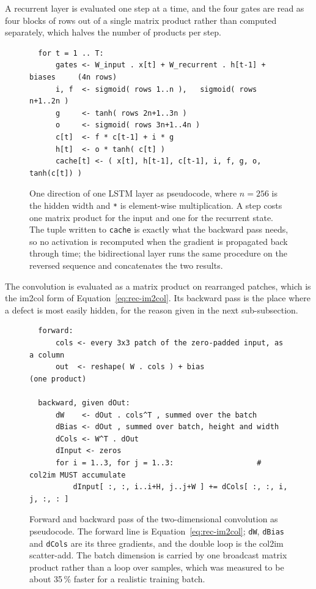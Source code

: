 A recurrent layer is evaluated one step at a time, and the four gates are read as four blocks of rows out of a single matrix product rather than computed separately, which halves the number of products per step.

\begin{figure}[h]
\centering
\fontsize{8.5}{10.2}\selectfont
\begin{verbatim}
  for t = 1 .. T:
      gates <- W_input . x[t] + W_recurrent . h[t-1] + biases     (4n rows)
      i, f  <- sigmoid( rows 1..n ),   sigmoid( rows n+1..2n )
      g     <- tanh( rows 2n+1..3n )
      o     <- sigmoid( rows 3n+1..4n )
      c[t]  <- f * c[t-1] + i * g
      h[t]  <- o * tanh( c[t] )
      cache[t] <- ( x[t], h[t-1], c[t-1], i, f, g, o, tanh(c[t]) )
\end{verbatim}
\caption{One direction of one LSTM layer as pseudocode, where $n=256$ is the hidden width and \texttt{*} is element-wise multiplication. A step costs one matrix product for the input and one for the recurrent state. The tuple written to \texttt{cache} is exactly what the backward pass needs, so no activation is recomputed when the gradient is propagated back through time; the bidirectional layer runs the same procedure on the reversed sequence and concatenates the two results.}
\label{fig:rec-lstmpseudo}
\end{figure}

The convolution is evaluated as a matrix product on rearranged patches, which is the im2col form of Equation~\ref{eq:rec-im2col}.
Its backward pass is the place where a defect is most easily hidden, for the reason given in the next sub-subsection.

\begin{figure}[h]
\centering
\fontsize{8.5}{10.2}\selectfont
\begin{verbatim}
  forward:
      cols <- every 3x3 patch of the zero-padded input, as a column
      out  <- reshape( W . cols ) + bias                     (one product)

  backward, given dOut:
      dW    <- dOut . cols^T , summed over the batch
      dBias <- dOut , summed over batch, height and width
      dCols <- W^T . dOut
      dInput <- zeros
      for i = 1..3, for j = 1..3:                   # col2im MUST accumulate
          dInput[ :, :, i..i+H, j..j+W ] += dCols[ :, :, i, j, :, : ]
\end{verbatim}
\caption{Forward and backward pass of the two-dimensional convolution as pseudocode. The forward line is Equation~\ref{eq:rec-im2col}; \texttt{dW}, \texttt{dBias} and \texttt{dCols} are its three gradients, and the double loop is the col2im scatter-add. The batch dimension is carried by one broadcast matrix product rather than a loop over samples, which was measured to be about 35\,\% faster for a realistic training batch.}
\label{fig:rec-convpseudo}
\end{figure}

